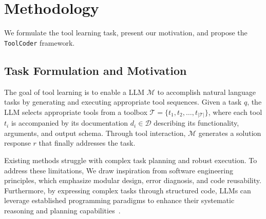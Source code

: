\section{Methodology}
We formulate the tool learning task, present our motivation, and propose the \texttt{ToolCoder} framework.

\subsection{Task Formulation and Motivation}
The goal of tool learning is to enable a LLM $\mathcal{M}$ to accomplish natural language tasks by generating and executing appropriate tool sequences. Given a task $q$, the LLM selects appropriate tools from a toolbox $\mathcal{T} = \{t_1, t_2, \ldots, t_{|\mathcal{T}|}\}$, where each tool $t_i$ is accompanied by its documentation $d_i \in \mathcal{D}$ describing its functionality, arguments, and output schema. Through tool interaction, $\mathcal{M}$ generates a solution response $r$ that finally addresses the task.

Existing methods struggle with complex task planning and robust execution. To address these limitations, We draw inspiration from software engineering principles, which emphasize modular design, error diagnosis, and code reusability. Furthermore, by expressing complex tasks through structured code, LLMs can leverage established programming paradigms to enhance their systematic reasoning and planning capabilities~\cite{DBLP:conf/icml/GaoMZ00YCN23, DBLP:conf/icml/WangCY0L0J24}.




